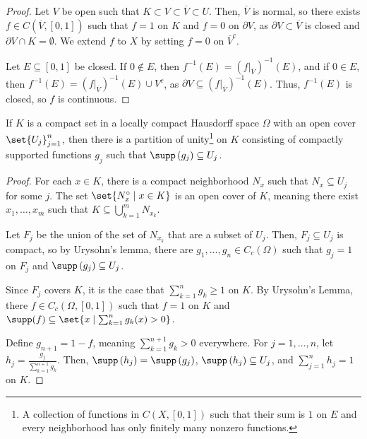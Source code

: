 \documentclass[10pt]{mypackage}
\begin{document}
\begin{proof}
  Let $V$ be open such that $K\subset V\subset \overline{V}\subset U$. Then, $\overline{V}$ is normal, so there exists $f\in C\left(\overline{V},[0,1]\right)$ such that $f = 1$ on $K$ and $f = 0$ on $\partial V$, as $\partial V \subset \overline{V}$ is closed and $\partial V \cap K = \emptyset$. We extend $f$ to $X$ by setting $f = 0$ on $\overline{V}^{c}$.\newline

  Let $E\subseteq [0,1]$ be closed. If $0\notin E$, then $f^{-1}\left(E\right) = \left(f|_{\overline{V}}\right)^{-1}\left(E\right)$, and if $0\in E$, then $f^{-1}\left(E\right) = \left(f|_{\overline{V}}\right)^{-1}\left(E\right) \cup V^c$, as $\partial V\subseteq \left(f|_{\overline{V}}\right)^{-1}\left(E\right)$. Thus, $f^{-1}\left(E\right)$ is closed, so $f$ is continuous.
\end{proof}
\begin{proposition}
    If $K$ is a compact set in a locally compact Hausdorff space $\Omega$ with an open cover $\set{U_j}_{j=1}^{n}$, then there is a partition of unity\footnote{A collection of functions in $C\left(X,[0,1]\right)$ such that their sum is $1$ on $E$ and every neighborhood has only finitely many nonzero functions.} on $K$ consisting of compactly supported functions $g_j$ such that $\supp\left(g_j\right)\subseteq U_j$.
\end{proposition}
\begin{proof}
  For each $x\in K$, there is a compact neighborhood $N_x$ such that $N_x\subseteq U_j$ for some $j$. The set $\set{N_x^{\circ}\mid x\in K}$ is an open cover of $K$, meaning there exist $x_1,\dots,x_m$ such that $K\subseteq \bigcup_{k=1}^{m}N_{x_k}$.\newline

  Let $F_j$ be the union of the set of $N_{x_k}$ that are a subset of $U_j$. Then, $F_j\subseteq U_j$ is compact, so by Urysohn's lemma, there are $g_1,\dots,g_n\in C_c\left(\Omega\right)$ such that $g_j = 1$ on $F_j$ and $\supp\left(g_j\right) \subseteq U_j$.\newline

  Since $F_j$ covers $K$, it is the case that $\sum_{k=1}^{n}g_k \geq 1$ on $K$. By Urysohn's Lemma, there $f\in C_c\left(\Omega,[0,1]\right)$ such that $f = 1$ on $K$ and $\supp(f) \subseteq \set{x\mid \sum_{k=1}^{n}g_k(x) > 0}$.\newline

  Define $g_{n+1} = 1 - f$, meaning $\sum_{k=1}^{n+1}g_{k} > 0$ everywhere. For $j = 1,\dots,n$, let $h_j = \frac{g_j}{\sum_{k=1}^{n+1}g_k}$. Then, $\supp\left(h_j\right) = \supp\left(g_j\right)$, $\supp\left(h_j\right) \subseteq U_j$, and $\sum_{j=1}^{n}h_j = 1$ on $K$.
\end{proof}
\end{document}
